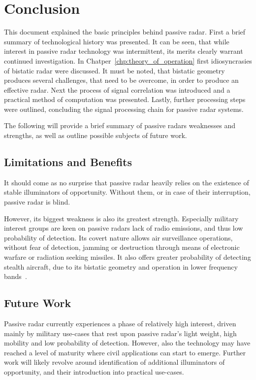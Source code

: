 \chapter{Conclusion}

This document explained the basic principles behind passive radar. First a brief summary of technological history was presented. It can be seen, that while interest in passive radar technology was intermittent, its merits clearly warrant continued investigation.
In Chatper~\ref{chp:theory_of_operation} first idiosyncrasies of bistatic radar were discussed. It must be noted, that bistatic geometry produces several challenges, that need to be overcome, in order to produce an effective radar. Next the process of signal correlation was introduced and a practical method of computation was presented. Lastly, further processing steps were outlined, concluding the signal processing chain for passive radar systems.

The following will provide a brief summary of passive radars weaknesses and strengths, as well as outline possible subjects of future work.

\section{Limitations and Benefits}

It should come as no surprise that passive radar heavily relies on the existence of stable illuminators of opportunity. Without them, or in case of their interruption, passive radar is blind.

However, its biggest weakness is also its greatest strength. Especially military interest groups are keen on passive radars lack of radio emissions, and thus low probability of detection. Its covert nature allows air surveillance operations, without fear of detection, jamming or destruction through means of electronic warfare or radiation seeking missiles. It also offers greater probability of detecting stealth aircraft, due to its bistatic geometry and operation in lower frequency bands~\cite[p.~2]{Malanowski2019}.

\section{Future Work}

Passive radar currently experiences a phase of relatively high interest, driven mainly by military use-cases that rest upon passive radar's light weight, high mobility and low probability of detection. However, also the technology may have reached a level of maturity where civil applications can start to emerge. Further work will likely revolve around identification of additional illuminators of opportunity, and their introduction into practical use-cases.
